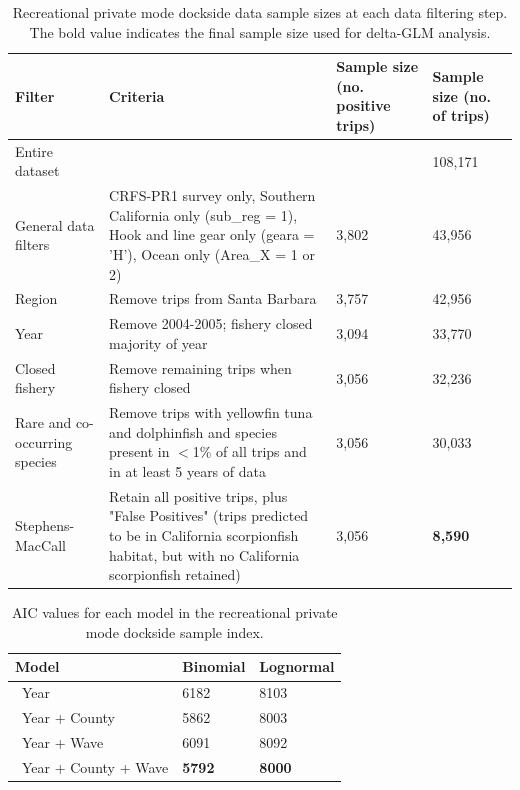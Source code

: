\documentclass[12pt,]{article}
\begin{document}
\FloatBarrier

\begin{table}[ht]
\centering
\caption{Recreational private mode dockside data sample 
                                          sizes at each data filtering step.  
                                          The bold value indicates the final sample size 
                                          used for delta-GLM analysis.} 
\label{tab:Fleet4_RecPR_dockside_filter}
\begin{tabular}{>{\raggedright}p{1.5in}>{\raggedright}p{2.6in}>{\raggedright}p{1in}>{\raggedright}p{1in}}
  \hline
Filter & Criteria & Sample size (no. positive trips) & Sample size (no. of trips) \\ 
  \hline
Entire dataset &  &  & 108,171 \\ 
  General data filters & CRFS-PR1 survey only, Southern California only (sub\_reg = 1), Hook and line gear only (geara = 'H'), Ocean only (Area\_X = 1 or 2) & 3,802 & 43,956 \\ 
  Region & Remove trips from Santa Barbara & 3,757 & 42,956 \\ 
  Year & Remove 2004-2005; fishery closed majority of year & 3,094 & 33,770 \\ 
  Closed fishery & Remove remaining trips when fishery closed & 3,056 & 32,236 \\ 
  Rare and co-occurring species & Remove trips with yellowfin tuna and dolphinfish and species present in $<$1\% of all trips and in at least 5 years of data & 3,056 & 30,033 \\ 
  Stephens-MacCall & Retain all positive trips, plus "False Positives" (trips predicted to be in California scorpionfish habitat, but with no California scorpionfish retained) & 3,056 & \textbf{8,590} \\ 
   \hline
\end{tabular}
\end{table}\vspace{3in}

\begin{table}[ht]
\centering
\caption{AIC values for each model in the
                                          recreational private mode dockside sample 
                                          index.} 
\label{tab:Fleet4_RecPR_dockside_aic}
\begin{tabular}{lll}
  \hline
Model & Binomial & Lognormal \\ 
  \hline
~Year & 6182 & 8103 \\ 
  ~Year + County & 5862 & 8003 \\ 
  ~Year + Wave & 6091 & 8092 \\ 
  ~Year + County + Wave & \textbf{5792} & \textbf{8000} \\ 
   \hline
\end{tabular}
\end{table}\vspace{3in}
\end{document}
